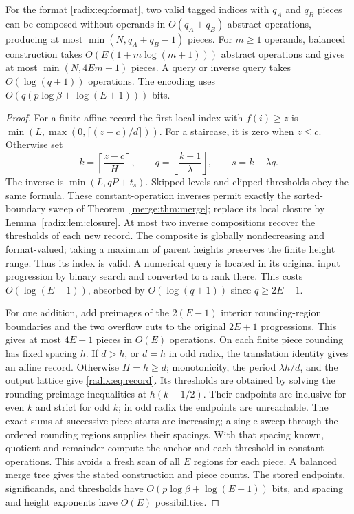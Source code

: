 \begin{corollary}\label{radix:cor:merge}
For the format \eqref{radix:eq:format}, two valid tagged indices with $q_A$ and
$q_B$ pieces can be composed without operands in $O(q_A+q_B)$ abstract
operations, producing at most $\min(N,q_A+q_B-1)$ pieces. For $m\geq1$
operands, balanced construction takes $O(E(1+m\log(m+1)))$ abstract
operations and gives at most $\min(N,4Em+1)$ pieces. A query or inverse
query takes $O(\log(q+1))$ operations. The encoding uses
$O(q(p\log\beta+\log(E+1)))$ bits.
\end{corollary}

\begin{proof}
For a finite affine record the first local index with $f(i)\geq z$ is
$\min(L,\max(0,\lceil(z-c)/d\rceil))$. For a staircase, it is zero
when $z\leq c$. Otherwise set
\[
 k=\left\lceil\frac{z-c}{H}\right\rceil,\qquad
 q=\left\lfloor\frac{k-1}{\lambda}\right\rfloor,\qquad
 s=k-\lambda q.
\]
The inverse is $\min(L,qP+t_s)$. Skipped levels and clipped thresholds
obey the same formula. These constant-operation inverses permit exactly
the sorted-boundary sweep of Theorem~\ref{merge:thm:merge}; replace its
local closure by Lemma~\ref{radix:lem:closure}. At most two inverse
compositions recover the thresholds of each new record.
The composite is globally nondecreasing and format-valued; taking a
maximum of parent heights preserves the finite height range. Thus its
index is valid. A numerical query is located in its original input
progression by binary search and converted to a rank there. This costs
$O(\log(E+1))$, absorbed by $O(\log(q+1))$ since $q\geq2E+1$.

For one addition, add preimages of the $2(E-1)$ interior rounding-region
boundaries and the two overflow cuts to the original $2E+1$ progressions.
This gives at most $4E+1$ pieces in $O(E)$ operations. On each finite
piece rounding has fixed spacing $h$. If $d>h$, or $d=h$ in odd radix,
the translation identity gives an affine record. Otherwise $H=h\geq d$;
monotonicity, the period $\lambda h/d$, and the output lattice give
\eqref{radix:eq:record}. Its thresholds are obtained by solving the
rounding preimage inequalities at $h(k-1/2)$. Their endpoints are
inclusive for even $k$ and strict for odd $k$; in odd radix the endpoints
are unreachable. The exact sums at successive piece starts are increasing;
a single sweep through the ordered rounding regions supplies their
spacings. With that spacing known, quotient and remainder compute the
anchor and each threshold in constant operations. This avoids a fresh
scan of all $E$ regions for each piece. A balanced merge tree gives the stated construction
and piece counts. The stored endpoints, significands, and thresholds
have $O(p\log\beta+\log(E+1))$ bits, and spacing and height exponents
have $O(E)$ possibilities.
\end{proof}

